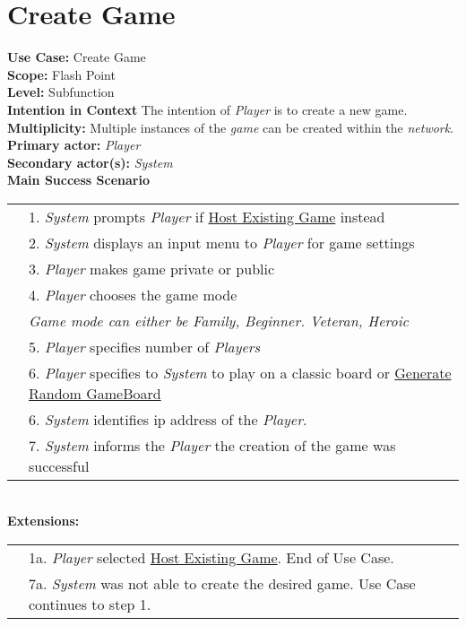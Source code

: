 \documentclass{article}
\begin{document}
	\section*{Create Game}
	\textbf{Use Case:} Create Game\\
	\textbf{Scope:}
	Flash Point\\
	\textbf{Level:}
	Subfunction\\
	\textbf{Intention in Context}
	The intention of \textit{Player} is to create a new game.\\
	\textbf{Multiplicity:}
	Multiple instances of the \textit{game} can be created within the \textit{network}.\\
	\textbf{Primary actor: } \textit{Player}\\
	\textbf{Secondary actor(s):} \textit{System}\\
	\textbf{Main Success Scenario}\\
	\begin{tabular}{l l}
		&1. \textit{System} prompts \textit{Player} if \underline{Host Existing Game} instead\\
		&2. \textit{System} displays an input menu to \textit{Player} for game settings\\
		&3. \textit{Player} makes game private or public\\
		&4. \textit{Player} chooses the game mode\\
		&\qquad \textit{Game mode can either be Family, Beginner. Veteran, Heroic}\\
		&5. \textit{Player} specifies number of \textit{Players}\\
		&6. \textit{Player} specifies to \textit{System} to play on a classic board or \underline{Generate Random GameBoard}\\
		&6. \textit{System} identifies ip address of the \textit{Player}.\\
		&7. \textit{System} informs the \textit{Player} the creation of the game was successful
	\end{tabular}\\
	\textbf{Extensions:}\\
	\begin{tabular}{l l}
		&1a. \textit{Player} selected \underline{Host Existing Game}. End of Use Case.\\
		&7a. \textit{System} was not able to create the desired game. Use Case continues to step 1.
	\end{tabular}
\end{document}
